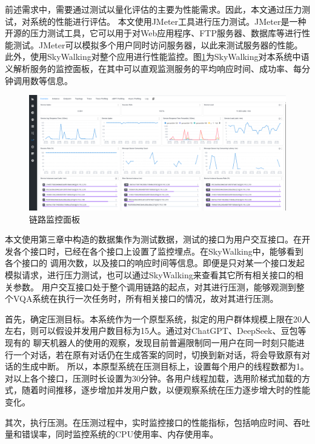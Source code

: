 前述需求中，需要通过测试以量化评估的主要为性能需求。因此，本文通过压力测试，对系统的性能进行评估。
本文使用JMeter工具进行压力测试。JMeter是一种开源的压力测试工具，它可以用于对Web应用程序、FTP服务器、数据库等进行性能测试。JMeter可以模拟多个用户同时访问服务器，以此来测试服务器的性能。
此外，使用SkyWalking对整个应用进行性能监控。图\ref{fig:SkyWalking}为SkyWalking对本系统中语义解析服务的监控面板，在其中可以直观监测服务的平均响应时间、成功率、每分钟调用数等信息。
\begin{figure}[htbp]
    \centering
    \includegraphics[width=\textwidth]{figures/SkyWalking.png}
    \caption{链路监控面板}
    \label{fig:SkyWalking}
\end{figure}

本文使用第三章中构造的数据集作为测试数据，测试的接口为用户交互接口。在开发各个接口时，已经在各个接口上设置了监控埋点。在SkyWalking中，能够看到各个接口的
调用次数，以及接口的响应时间等信息。即便是只对某一个接口发起模拟请求，进行压力测试，也可以通过SkyWalking来查看其它所有相关接口的相关参数。
用户交互接口处于整个调用链路的起点，对其进行压测，能够观测到整个VQA系统在执行一次任务时，所有相关接口的情况，故对其进行压测。

首先，确定压测目标。本系统作为一个原型系统，拟定的用户群体规模上限在20人左右，则可以假设并发用户数目标为15人。通过对ChatGPT、DeepSeek、豆包等现有的
聊天机器人的使用的观察，发现目前普遍限制同一用户在同一时刻只能进行一个对话，若在原有对话仍在生成答案的同时，切换到新对话，将会导致原有对话的生成中断。
所以，本原型系统在压测目标上，设置每个用户的线程数都为1。
对以上各个接口，压测时长设置为30分钟。各用户线程加载，选用阶梯式加载的方式，随着时间推移，逐步增加并发用户数，以便观察系统在压力逐步增大时的性能变化。

其次，执行压测。在压测过程中，实时监控接口的性能指标，包括响应时间、吞吐量和错误率，同时监控系统的CPU使用率、内存使用率。

